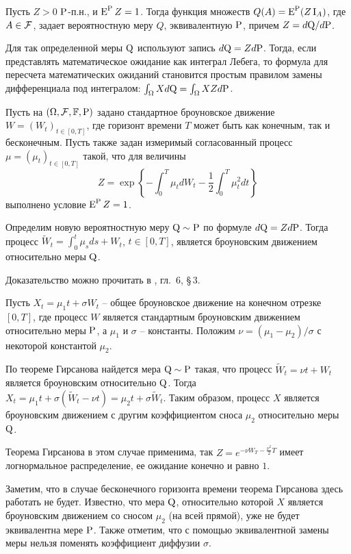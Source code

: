\begin{proposition}
Пусть $Z>0$ $\P$-п.н., и $\E^{\P} Z = 1$. Тогда функция множеств $Q(A) = \E^{\P}(Z\I_A)$, где $A\in \F$, задает вероятностную меру $Q$, эквивалентную $\P$, причем $Z = d\Q/d\P$.
\end{proposition}

Для так определенной меры $\Q$ используют запись $d\Q = Z d\P$.
Тогда, если представлять математическое ожидание как интеграл Лебега, то  формула для пересчета математических ожиданий становится простым правилом замены дифференциала под интегралом: $\int_\Omega X d\Q = \int_\Omega X Zd\P$.

\begin{theorem}
Пусть на $(\Omega, \F, \FF, \P)$ задано стандартное броуновское движение $W=(W_t)_{t\in[0,T]}$, где горизонт времени $T$ может быть как конечным, так и бесконечным.
Пусть также задан измеримый согласованный процесс $\mu = (\mu_t)_{t\in[0,T]}$ такой, что для величины
\[
Z = \exp\left\{-\int_0^T \mu_t d W_t - \frac12 \int_0^T \mu_t^2 dt\right\}
\]
выполнено условие $\E^{\P} Z = 1$. 

Определим новую вероятностную меру $\Q\sim\P$ по формуле $d\Q = Zd\P$.
Тогда процесс $\tilde W_t = \int_0^t \mu_s ds + W_t$, $t\in[0,T]$, является броуновским движением относительно меры $\Q$.
\end{theorem}

Доказательство можно прочитать в \cite{LiptserShiryaev74}, гл.~6, \S\,3. 

\begin{example}
Пусть $X_t = \mu_1 t + \sigma W_t$ -- общее броуновское движение на конечном отрезке $[0,T]$, где процесс $W$ является стандартным броуновским движением относительно меры $\P$, а $\mu_1$ и $\sigma$ -- константы.
Положим $\nu=(\mu_1-\mu_2)/\sigma$ с некоторой константой $\mu_2$.

По теореме Гирсанова найдется мера $\Q\sim\P$ такая, что процесс $\tilde W_t = \nu t + W_t$ является броуновским относительно $\Q$.
Тогда $X_t = \mu_1t + \sigma (\tilde W_t - \nu t) = \mu_2 t + \sigma \tilde W_t$.
Таким образом, процесс $X$ является броуновским движением с другим коэффициентом сноса $\mu_2$ относительно меры $\Q$.

Теорема Гирсанова в этом случае применима, так $Z = e^{-\nu W_T - \frac{\nu^2}2 T}$ имеет логнормальное распределение, ее ожидание конечно и равно $1$.

Заметим, что в случае бесконечного горизонта времени теорема Гирсанова здесь работать не будет. 
Известно, что мера $\Q$, относительно которой $X$ является броуновским движением со сносом $\mu_2$ (на всей прямой), уже не будет эквивалентна мере $\P$.
Также отметим, что с помощью эквивалентной замены меры нельзя поменять коэффициент диффузии $\sigma$.
\end{example}

